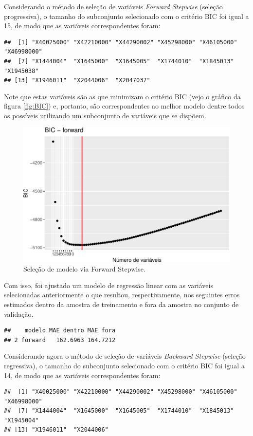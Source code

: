 \documentclass[11pt,]{article}
\begin{document}
Considerando o método de seleção de variáveis \textit{Forward Stepwise}
(seleção progressiva), o tamanho do subconjunto selecionado com o
critério BIC foi igual a 15, de modo que as variáveis correspondentes
foram:

\begin{verbatim}
##  [1] "X40025000" "X42210000" "X44290002" "X45298000" "X46105000" "X46998000"
##  [7] "X1444004"  "X1645000"  "X1645005"  "X1744010"  "X1845013"  "X1945038" 
## [13] "X1946011"  "X2044006"  "X2047037"
\end{verbatim}

\noindent Note que estas variáveis são as que minimizam o critério BIC
(vejo o gráfico da figura \eqref{fig:BIC}) e, portanto, são
correspondentes ao melhor modelo dentre todos os possíveis utilizando um
subconjunto de variáveis que se dispõem.

\begin{figure}

{\centering \includegraphics[width=0.6\linewidth]{figs/BIC} 

}

\caption{Seleção de modelo via Forward Stepwise.}\label{fig:BIC}
\end{figure}

\noindent Com isso, foi ajustado um modelo de regressão linear com as
variáveis selecionadas anteriormente o que resultou, respectivamente,
nos seguintes erros estimados dentro da amostra de treinamento e fora da
amostra no conjunto de validação.

\begin{verbatim}
##    modelo MAE dentro MAE fora
## 2 forward   162.6963 164.7212
\end{verbatim}

Considerando agora o método de seleção de variáveis
\textit{Backward Stepwise} (seleção regressiva), o tamanho do
subconjunto selecionado com o critério BIC foi igual a 14, de modo que
as variáveis correspondentes foram:

\begin{verbatim}
##  [1] "X40025000" "X42210000" "X44290002" "X45298000" "X46105000" "X46998000"
##  [7] "X1444004"  "X1645000"  "X1645005"  "X1744010"  "X1845013"  "X1945004" 
## [13] "X1946011"  "X2044006"
\end{verbatim}
\end{document}
